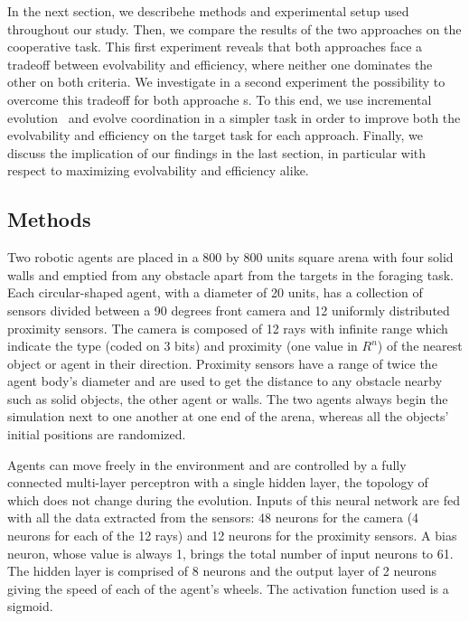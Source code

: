   In the next section, we describehe methods and experimental setup used throughout our study. Then, we compare the results of the two approaches on the cooperative task. This first experiment reveals that both approaches face a tradeoff between evolvability and efficiency, where neither one dominates the other on both criteria. We investigate in a second experiment the possibility to overcome this tradeoff for both approache s. To this end, we use incremental evolution~\cite{Harvey1994, Urzelai1998} and evolve coordination in a simpler task in order to improve both the evolvability and efficiency on the target task for each approach. Finally, we discuss the implication of our findings in the last section, in particular with respect to maximizing evolvability and efficiency alike.


  \subsection{Methods}
  

  Two robotic agents are placed in a 800 by 800 units square arena with four solid walls and emptied from any obstacle apart from the targets in the foraging task. Each circular-shaped agent, with a diameter of 20 units, has a collection of sensors divided between a 90 degrees front camera and 12 uniformly distributed proximity sensors. The camera is composed of 12 rays with infinite range which indicate the type (coded on 3 bits) and proximity (one value in $R^n$) of the nearest object or agent in their direction. Proximity sensors have a range of twice the agent body's diameter and are used to get the distance to any obstacle nearby such as solid objects, the other agent or walls. The two agents always begin the simulation next to one another at one end of the arena, whereas all the objects' initial positions are randomized.

  Agents can move freely in the environment and are controlled by a fully connected multi-layer perceptron with a single hidden layer, the topology of which does not change during the evolution. Inputs of this neural network are fed with all the data extracted from the sensors: 48 neurons for the camera (4 neurons for each of the 12 rays) and 12 neurons for the proximity sensors. A bias neuron, whose value is always 1, brings the total number of input neurons to 61. The hidden layer is comprised of 8 neurons and the output layer of 2 neurons giving the speed of each of the agent's wheels. The activation function used is a sigmoid.

